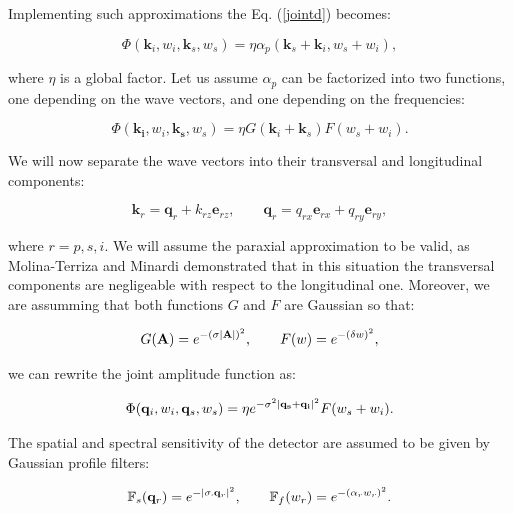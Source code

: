 \documentclass[12pt]{book}
\begin{document}
Implementing such approximations the Eq. (\ref{jointd}) becomes:

\begin{equation}
\Phi(\mathbf{k}_{i},w_{i},\mathbf{k}_{s},w_{s})= \eta \alpha_{p}(\mathbf{k}_{s}+\mathbf{k}_{i},w_{s}+w_{i}) ,
\end{equation}


where $\eta$ is a global factor. Let us assume  $\alpha_{p}$ can be factorized into two functions, one depending on the wave vectors, and one depending on the frequencies:

\begin{equation}
\Phi(\mathbf{k_{i}},w_{i},\mathbf{k_{s}},w_{s})= \eta G(\mathbf{k}_{i}+\mathbf{k}_{s}) F(w_{s}+w_{i}) .
\end{equation}
 
We  will now separate the wave vectors into their transversal and longitudinal components:

\begin{equation}
\mathbf{k}_{r}=\mathbf{q}_{r}+k_{rz} \mathbf{e}_{rz},\qquad \mathbf{q}_{r}=q_{rx} \mathbf{e}_{rx}+q_{ry} \mathbf{e}_{ry},
\end{equation}

where $r=p, s, i$. We will assume the paraxial approximation to be valid,  as Molina-Terriza and Minardi \cite{minardi} demonstrated that in this situation the transversal components are negligeable with respect to the longitudinal one. Moreover, we are assumming that both functions $G$ and $F$ are Gaussian so that:

\begin{equation}
G(\mathbf{A})=e^{- (\sigma \abs{\mathbf{A}})^{2} },\qquad F(w)=e^{-(\delta w)^2},
\end{equation}

we can rewrite the joint amplitude function as:

\begin{equation}
\Phi(\mathbf{q}_{i},w_{i},\mathbf{q}_{s},w_{s})= \eta e^{-\sigma^{2}\abs{\mathbf{q_{s}}+\mathbf{q_{i}}}^{2}} F(w_{s}+w_{i}).\label{true}
\end{equation}

The spatial and spectral sensitivity of the detector are assumed to be given by Gaussian profile filters:

\begin{equation}
\mathbb{F}_{s}(\mathbf{q}_{r})=e^{-\abs{\mathbf{\sigma}.\mathbf{q}_{r}}^{2}},\qquad \mathbb{F}_{f}(w_{r})=e^{-(\alpha_{r} w_{r})^{2}}. \label{filter}
\end{equation}
\end{document}

